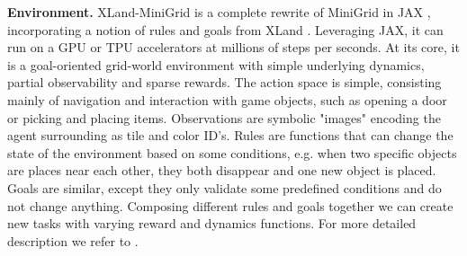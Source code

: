 \documentclass{article}
\begin{document}


\textbf{Environment.} XLand-MiniGrid is a complete rewrite of MiniGrid \citep{MinigridMiniworld23} in JAX \citep{jax2018github}, incorporating a notion of rules and goals from XLand \citep{team2023human}. Leveraging JAX, it can run on a GPU or TPU accelerators at millions of steps per seconds. At its core, it is a goal-oriented grid-world environment with simple underlying dynamics, partial observability and sparse rewards. The action space is simple, consisting mainly of navigation and interaction with game objects, such as opening a door or picking and placing items. Observations are symbolic "images" encoding the agent surrounding as tile and color ID's. Rules are functions that can change the state of the environment based on some conditions, e.g. when two specific objects are places near each other, they both disappear and one new object is placed. Goals are similar, except they only validate some predefined conditions and do not change anything. Composing different rules and goals together we can create new tasks with varying reward and dynamics functions. For more detailed description we refer to \citet{nikulin2023xland}.
\end{document}
